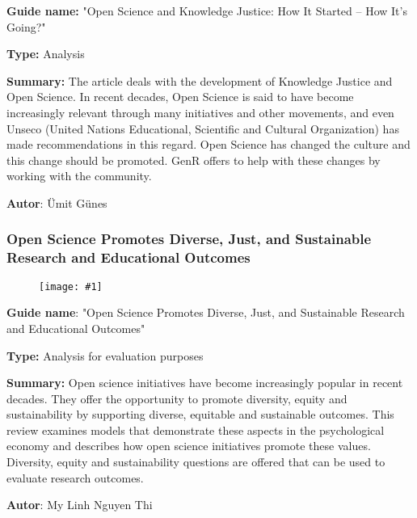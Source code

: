 \documentclass{article}
\newlength{\imgwidth}
\newcommand\scaledgraphics[2]{%
                
\settowidth{\imgwidth}{\texttt{[image: \#1]}}%
                
\setlength{\imgwidth}{\minof{\imgwidth}{#2\textwidth}}%
                
\texttt{[image: \#1]}%
                
}
\begin{document}
\textbf{Guide name:} "Open Science and Knowledge Justice: How It Started – How It’s Going?" \autocite{noauthor_open_2021}


\textbf{Type:} Analysis


\textbf{Summary:} The article deals with the development of Knowledge Justice and Open Science. In recent decades, Open Science is said to have become increasingly relevant through many initiatives and other movements, and even Unseco (United Nations Educational, Scientific and Cultural Organization) has made recommendations in this regard. Open Science has changed the culture and this change should be promoted. GenR offers to help with these changes by working with the community.


\textbf{Autor}: Ümit Günes


\subsubsection{Open Science Promotes Diverse, Just, and Sustainable Research and Educational Outcomes}\label{H4807510}


\begin{figure}
\scaledgraphics{23f9ee73-dda2-4a56-8083-4a618f9983b9.png}{1}
\label{F46402811}
\end{figure}





\textbf{Guide name}: "Open Science Promotes Diverse, Just, and Sustainable Research and Educational Outcomes" \autocite{grahe_open_2019}


\textbf{Type: }Analysis for evaluation purposes


\textbf{Summary:} Open science initiatives have become increasingly popular in recent decades. They offer the opportunity to promote diversity, equity and sustainability by supporting diverse, equitable and sustainable outcomes. This review examines models that demonstrate these aspects in the psychological economy and describes how open science initiatives promote these values. Diversity, equity and sustainability questions are offered that can be used to evaluate research outcomes.


\textbf{Autor}: My Linh Nguyen Thi


\printbibliography[title={Bibliography}]
\end{document}
